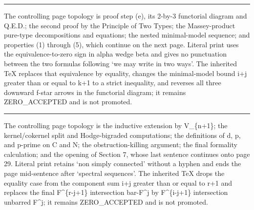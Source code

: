 \documentclass[
  english,
  a3paper,
  a3paper]{extarticle}
\begin{document}

\par

\vspace{0.7mm}\hrule\vspace{1.6mm}

\fontsize{11}{14}\selectfont

The controlling page topology is proof step (e), its 2-by-3 functorial
diagram and Q.E.D.; the second proof by the Principle of Two Types; the
Massey-product pure-type decompositions and equations; the nested
minimal-model sequence; and properties (1) through (5), which continue
on the next page. Literal print uses the equivalence-to-zero sign in
alpha wedge beta and gives no punctuation between the two formulas
following `we may write in two ways'. The inherited TeX replaces that
equivalence by equality, changes the minimal-model bound i+j greater
than or equal to k+1 to a strict inequality, and reverses all three
downward f-star arrows in the functorial diagram; it remains
ZERO\_ACCEPTED and is not promoted.

\clearpage



\par

\vspace{0.7mm}\hrule\vspace{1.6mm}

\fontsize{11}{14}\selectfont

The controlling page topology is the inductive extension by V\_\{n+1\};
the kernel/cokernel split and Hodge-bigraded computations; the
definitions of d, p, and p-prime on C and N; the obstruction-killing
argument; the final formality calculation; and the opening of Section 7,
whose last sentence continues onto page 29. Literal print retains `non
simply connected' without a hyphen and ends the page mid-sentence after
`spectral sequences'. The inherited TeX drops the equality case from the
component sum i+j greater than or equal to r+1 and replaces the final
F\^{}\{r-j+1\} intersection bar-F\^{}j by F\^{}\{i-j+1\} intersection
unbarred F\^{}j; it remains ZERO\_ACCEPTED and is not promoted.

\clearpage

\end{document}
